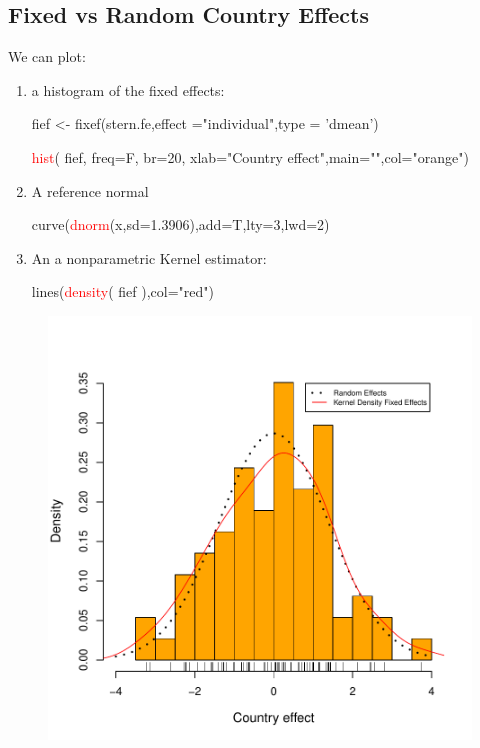 \documentclass[landscape,letterpaper,9pt]{article}
\begin{document}
\subsection{Fixed vs Random Country Effects}
We can plot:
\begin{enumerate}
\item 
 a histogram of the fixed effects:
\begin{CVerbatim}
fief <- fixef(stern.fe,effect ="individual",type = 'dmean')

\textcolor{red}{hist}( fief, freq=F, br=20, xlab="Country effect",main="",col="orange")
\end{CVerbatim}
\item A reference normal
\begin{CVerbatim}
 curve(\textcolor{red}{dnorm}(x,sd=1.3906),add=T,lty=3,lwd=2)
\end{CVerbatim}
\item An a nonparametric Kernel estimator:
\begin{CVerbatim}
lines(\textcolor{red}{density}( fief ),col="red")
\end{CVerbatim}
\end{enumerate}
\begin{center}
\begin{figure}[h!]
  \centering \leavevmode \includegraphics[angle=0,width=5.5in]{covsraeff.pdf}
\end{figure}
\end{center}
\end{document}
